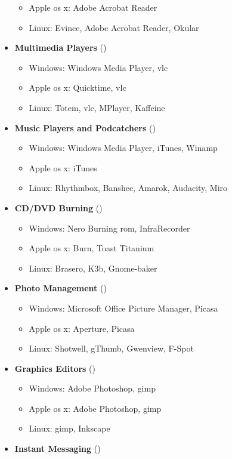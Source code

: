 \begin{eng}
\begin{itemize}
\begin{itemize}
			\item Apple os x: Adobe Acrobat Reader
			\item Linux: Evince, Adobe Acrobat Reader, Okular
		\end{itemize}
		\item \textbf{Multimedia Players} ()
		\begin{itemize}
			\item Windows: Windows Media Player, vlc
			\item Apple os x: Quicktime, vlc
			\item Linux: Totem, vlc, MPlayer, Kaffeine
		\end{itemize}
		\item \textbf{Music Players and Podcatchers} ()
		\begin{itemize}
			\item Windows: Windows Media Player, iTunes, Winamp
			\item Apple os x: iTunes
			\item Linux: Rhythmbox, Banshee, Amarok, Audacity, Miro
		\end{itemize}
		\item \textbf{CD/DVD Burning} ()
		\begin{itemize}
			\item Windows: Nero Burning rom, InfraRecorder
			\item Apple os x: Burn, Toast Titanium
			\item Linux: Brasero, K3b, Gnome-baker
		\end{itemize}
		\item \textbf{Photo Management} ()
		\begin{itemize}
			\item Windows: Microsoft Office Picture Manager, Picasa
			\item Apple os x: Aperture, Picasa
			\item Linux: Shotwell, gThumb, Gwenview, F-Spot
		\end{itemize}
		\item \textbf{Graphics Editors} ()
		\begin{itemize}
			\item Windows: Adobe Photoshop, gimp
			\item Apple os x: Adobe Photoshop, gimp
			\item Linux: gimp, Inkscape
		\end{itemize}
		\item \textbf{Instant Messaging} ()

\end{itemize}
\end{eng}
